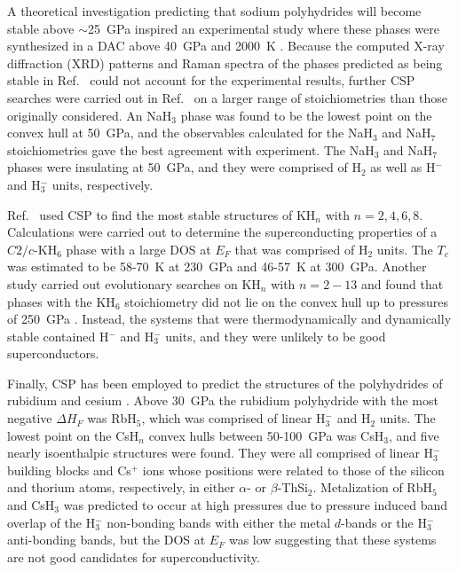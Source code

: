 \documentclass[12pt,letterpaper,oneside]{article}
\begin{document}
A theoretical investigation predicting that sodium polyhydrides will become stable above $\sim$25~GPa \cite{Baettig:2011} inspired an experimental study where these phases were synthesized in a DAC above 40~GPa and 2000~K \cite{Struzhkin:2016}. Because the computed X-ray diffraction (XRD) patterns and Raman spectra of the phases predicted as being stable in Ref.\ \cite{Baettig:2011} could not account for the experimental results, further CSP searches were carried out in Ref.\ \cite{Struzhkin:2016} on a larger range of stoichiometries than those originally considered. An NaH$_3$ phase was found to be the lowest point on the convex hull at 50~GPa, and the observables calculated for the NaH$_3$ and NaH$_7$ stoichiometries gave the best agreement with experiment. The NaH$_3$ and NaH$_7$ phases were insulating at 50~GPa, and they were comprised of H$_2$ as well as H$^-$ and H$_3^-$ units, respectively. 

Ref.\ \cite{Zhou:2012a} used CSP to find the most stable structures of KH$_n$ with $n=2,4,6,8$. Calculations were carried out to determine the superconducting properties of a $C2/c$-KH$_6$ phase with a large DOS at $E_F$ that was comprised of H$_2$ units. The $T_c$ was estimated to be 58-70~K at 230~GPa and 46-57~K at 300~GPa. Another study carried out evolutionary searches on KH$_n$ with $n=2-13$ and found that phases with the KH$_6$ stoichiometry did not lie on the convex hull up to pressures of 250~GPa \cite{Hooper:2012a}. Instead, the systems that were thermodynamically and dynamically stable contained H$^-$ and H$_3^-$ units, and they were unlikely to be good superconductors.

Finally, CSP has been employed to predict the structures of the polyhydrides of rubidium \cite{Hooper:2011a} and cesium \cite{Shamp:2012}. Above 30~GPa the rubidium polyhydride with the most negative $\Delta H_F$ was RbH$_5$, which was comprised of linear H$_3^-$ and H$_2$ units. The lowest point on the CsH$_n$ convex hulls between 50-100~GPa was CsH$_3$, and five nearly isoenthalpic structures were found. They were all comprised of linear H$_3^-$ building blocks and Cs$^+$ ions whose positions were related to those of the silicon and thorium atoms, respectively, in either $\alpha$- or $\beta$-ThSi$_2$. Metalization of RbH$_5$ and CsH$_3$ was predicted to occur at high pressures due to pressure induced band overlap of the H$_3^-$ non-bonding bands with either the metal $d$-bands or the H$_3^-$ anti-bonding bands, but the DOS at $E_F$ was low suggesting that these systems are not good candidates for superconductivity.
\end{document}
